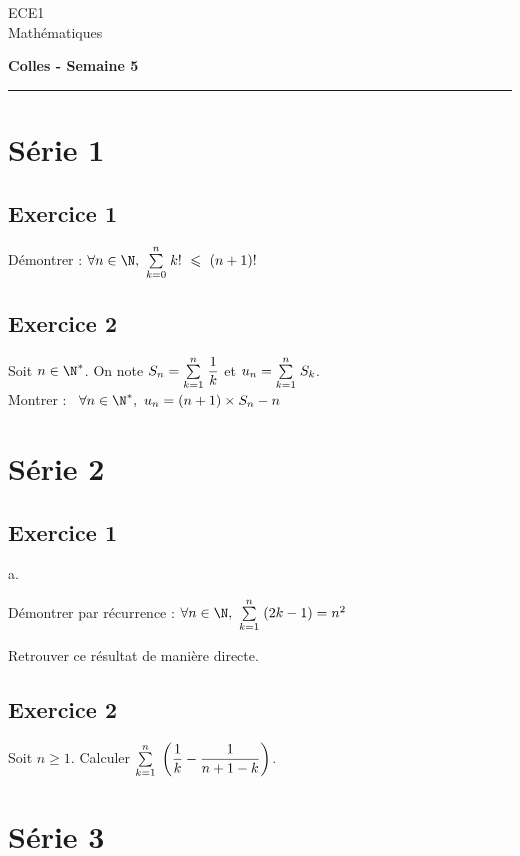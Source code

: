 \documentclass[11pt]{article}%
\begin{document}
\begin{flushleft}
ECE1 \\
Mathématiques
\end{flushleft}

\begin{center}
\textbf{\Large{Colles - Semaine 5}}
\end{center}

\hrule

\vspace*{0,2cm}

\section{Série 1}

\subsection*{Exercice 1}
\noindent
Démontrer : $\forall n \in \N, \ \Sum{k=0}{n} k! \ \leq \ (n+1)!$

\subsection*{Exercice 2}
\noindent
Soit $n \in \N^*$. On note $S_n = {\textstyle\sum\limits_{k=1}^{n}}\hspace{.1cm} \dfrac{1}{k}$ et $u_n
  = {\textstyle\sum\limits_{k=1}^{n}}\hspace{.1cm} S_k$.\\[.2cm]
  Montrer : \ $\forall n \in \N^*, \ u_n = (n+1) \times S_n - n$


\section{Série 2}
\subsection*{Exercice 1}
\noindent
  \begin{noliste}{a.}
  \item Démontrer par récurrence : $\forall n \in \N, \
    \Sum{k=1}{n} (2k-1) = n^2$
  \item Retrouver ce résultat de manière directe.
  \end{noliste}


\subsection*{Exercice 2}
\noindent
  Soit $n\geq 1$. Calculer ${\textstyle\sum\limits_{k=1}^{n}}\hspace{.1cm} \left( \dfrac{1}{k} -
    \dfrac{1}{n+1-k} \right)$.

\section{Série 3}
\end{document}
